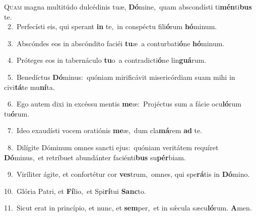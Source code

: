 \lettrine{\initial\textcolor{\initialcolor}{Q}}{uam} magna multitúdo dulcédinis tuæ, \textbf{Dó}\-mine,~\star quam abscondísti ti\-\textbf{mén}\-ti\textbf{bus} te.\\
{\numbfont\textcolor{\numbcolor}{~2.}}~Perfecísti eis, qui sperant \textbf{in} te,~\star in conspéctu fili\-\textbf{ó}\-rum \textbf{hó}\-minum.\par
{\numbfont\textcolor{\numbcolor}{~3.}}~Abscóndes eos in abscóndito faciéi \textbf{tu}\-æ~\star a conturbati\-\textbf{ó}\-ne \textbf{hó}\-minum.\par
{\numbfont\textcolor{\numbcolor}{~4.}}~Próteges eos in tabernáculo \textbf{tu}\-o~\star a contradicti\-\textbf{ó}\-ne lin\-\textbf{guá}\-rum.\par
{\numbfont\textcolor{\numbcolor}{~5.}}~Benedíctus \textbf{Dó}\-minus:~\star quóniam mirificávit misericórdiam suam mihi in civi\-\textbf{tá}\-te mu\-\textbf{ní}\-ta.\par
{\numbfont\textcolor{\numbcolor}{~6.}}~Ego autem dixi in excéssu mentis \textbf{me}\-æ:~\star Projéctus sum a fácie ocu\-\textbf{ló}\-rum tu\-\textbf{ó}\-rum.\par
{\numbfont\textcolor{\numbcolor}{~7.}}~Ideo exaudísti vocem oratiónis \textbf{me}\-æ,~\star dum cla\-\textbf{má}\-rem \textbf{ad} te.\par
{\numbfont\textcolor{\numbcolor}{~8.}}~Dilígite Dóminum omnes sancti ejus:~\dagger quóniam veritátem requíret \textbf{Dó}\-minus,~\star et retríbuet abundánter faciénti\textbf{bus} su\-\textbf{pér}\-biam.\par
{\numbfont\textcolor{\numbcolor}{~9.}}~Viríliter ágite, et confortétur cor \textbf{ves}\-trum,~\star omnes, qui spe\-\textbf{rá}\-tis in \textbf{Dó}\-mino.\par
{\numbfont\textcolor{\numbcolor}{10.}}~Glória Patri, et \textbf{Fí}\-lio,~\star et Spi\-\textbf{rí}\-tui \textbf{Sanc}\-to.\par
{\numbfont\textcolor{\numbcolor}{11.}}~Sicut erat in princípio, et nunc, et \textbf{sem}\-per,~\star et in sǽcula sæcu\-\textbf{ló}\-rum. \textbf{A}\-men.\par
